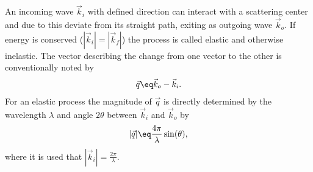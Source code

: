 \documentclass[\main/dresen_thesis.tex]{subfiles}
\begin{document}
An incoming wave $\vec{k}_i$ with defined direction can interact with a scattering center and due to this deviate from its straight path, exiting as outgoing wave $\vec{k}_o$. 
If energy is conserved ($|\vec{k}_i| = |\vec{k}_f|$) the process is called elastic and otherwise inelastic.
The vector describing the change from one vector to the other is conventionally noted by
\begin{align}
  \vec{q} \eq \vec{k}_o - \vec{k}_i.
\end{align}
For an elastic process the magnitude of $\vec{q}$ is directly determined by the wavelength $\lambda$ and angle $2\theta$ between $\vec{k}_i$ and $\vec{k}_o$ by
\begin{align}
  |\vec{q}| \eq \frac{4 \pi}{\lambda} \sin(\theta),
\end{align}
where it is used that $|\vec{k}_i| = \frac{2 \pi}{\lambda}$.
\end{document}
